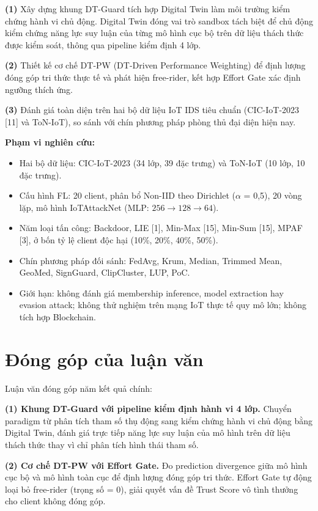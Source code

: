 \textbf{(1)} Xây dựng khung DT-Guard tích hợp Digital Twin làm môi trường kiểm chứng hành vi chủ động. Digital Twin đóng vai trò sandbox tách biệt để chủ động kiểm chứng năng lực suy luận của từng mô hình cục bộ trên dữ liệu thách thức được kiểm soát, thông qua pipeline kiểm định 4 lớp.

\textbf{(2)} Thiết kế cơ chế DT-PW (DT-Driven Performance Weighting) để định lượng đóng góp tri thức thực tế và phát hiện free-rider, kết hợp Effort Gate xác định ngưỡng thích ứng.

\textbf{(3)} Đánh giá toàn diện trên hai bộ dữ liệu IoT IDS tiêu chuẩn (CIC-IoT-2023 {[}11{]} và ToN-IoT), so sánh với chín phương pháp phòng thủ đại diện hiện nay.

\textbf{Phạm vi nghiên cứu:}

\begin{itemize}
\item
  Hai bộ dữ liệu: CIC-IoT-2023 (34 lớp, 39 đặc trưng) và ToN-IoT (10 lớp, 10 đặc trưng).
\item
  Cấu hình FL: 20 client, phân bổ Non-IID theo Dirichlet ($\alpha$ = 0,5), 20 vòng lặp, mô hình IoTAttackNet (MLP: $256\rightarrow128\rightarrow64$).
\item
  Năm loại tấn công: Backdoor, LIE {[}1{]}, Min-Max {[}15{]}, Min-Sum {[}15{]}, MPAF {[}3{]}, ở bốn tỷ lệ client độc hại (10\%, 20\%, 40\%, 50\%).
\item
  Chín phương pháp đối sánh: FedAvg, Krum, Median, Trimmed Mean, GeoMed, SignGuard, ClipCluster, LUP, PoC.
\item
  Giới hạn: không đánh giá membership inference, model extraction hay evasion attack; không thử nghiệm trên mạng IoT thực tế quy mô lớn; không tích hợp Blockchain.
\end{itemize}

\section{Đóng góp của luận văn}
Luận văn đóng góp năm kết quả chính:

\textbf{(1) Khung DT-Guard với pipeline kiểm định hành vi 4 lớp.} Chuyển paradigm từ phân tích tham số thụ động sang kiểm chứng hành vi chủ động bằng Digital Twin, đánh giá trực tiếp năng lực suy luận của mô hình trên dữ liệu thách thức thay vì chỉ phân tích hình thái tham số.

\textbf{(2) Cơ chế DT-PW với Effort Gate.} Đo prediction divergence giữa mô hình cục bộ và mô hình toàn cục để định lượng đóng góp tri thức. Effort Gate tự động loại bỏ free-rider (trọng số = 0), giải quyết vấn đề Trust Score vô tình thưởng cho client không đóng góp.

